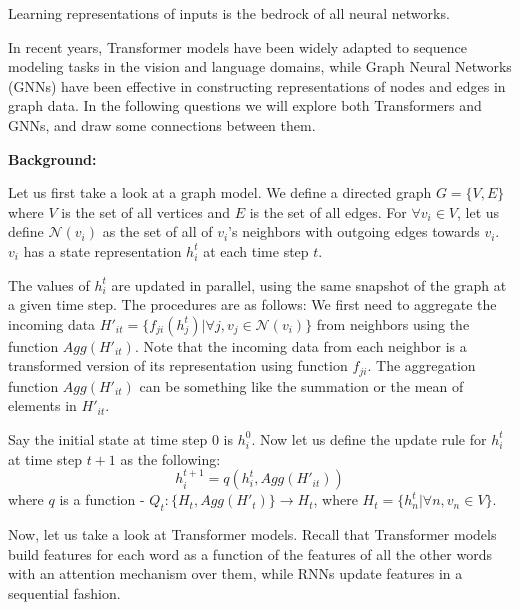 Learning representations of inputs is the bedrock of all neural networks.

In recent years, Transformer models have been widely adapted to sequence modeling tasks in the vision and language domains, while Graph Neural Networks (GNNs) have been effective in constructing representations of nodes and edges in graph data. In the following questions we will explore both Transformers and GNNs, and draw some connections between them.

\textbf{Background:}

Let us first take a look at a graph model. We define a directed graph $G = \{V,E\}$ where $V$ is the set of all vertices and $E$ is the set of all edges. For $\forall v_i \in V$, let us define $\mathcal{N}(v_i)$ as the set of all of $v_i$'s neighbors with outgoing edges towards $v_i$. $v_i$ has a state representation $h_i^{t}$ at each time step $t$.

The values of $h_i^{t}$ are updated in parallel, using the same snapshot of the graph at a given time step. The procedures are as follows: We first need to aggregate the incoming data $H'_{it} = \{f_{ji}(h_j^{t})| \forall j, v_j \in \mathcal{N}(v_i)\}$ from neighbors using the function $Agg(H'_{it})$. Note that the incoming data from each neighbor is a transformed version of its representation using function $f_{ji}$. The aggregation function $Agg(H'_{it})$ can be something like the summation or the mean of elements in $H'_{it}$. 

Say the initial state at time step 0 is $h_i^{0}$. Now let us define the update rule for $h_i^{t}$ at time step $t+1$ as the following:
        \begin{equation} \label{eq:GNN}
            h_i^{t+1} = q(h_i^{t}, Agg(H'_{it}))
        \end{equation}
    where $q$ is a function - $Q_{t}: \{H_{t},Agg(H'_{t})\} \rightarrow H_{t}$, where $H_{t} = \{h_n^{t}| \forall n, v_n \in V\}$. 

Now, let us take a look at Transformer models. Recall that Transformer models build features for each word as a function of the features of all the other words with an attention mechanism over them, while RNNs update features in a sequential fashion. 


